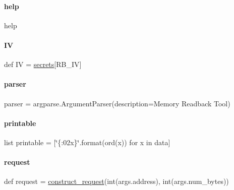 \mbox{\label{namespacereadback_a81ae9faedaa69e3e28e2960a0548df8d}} 
\paragraph{\texorpdfstring{help}{help}}
{\footnotesize\ttfamily help}

\mbox{\label{namespacereadback_ae386c01157ae5fa56c90d5430fda2f06}} 
\paragraph{\texorpdfstring{IV}{IV}}
{\footnotesize\ttfamily def IV = \hyperlink{namespacereadback_a7ef58b6350bb8f1ea4b81d24cac72a55}{secrets}\mbox{[}\textquotesingle{}R\+B\+\_\+\+IV\textquotesingle{}\mbox{]}}

\mbox{\label{namespacereadback_a90eee7a4677ca8b1ed116364a24367f9}} 
\paragraph{\texorpdfstring{parser}{parser}}
{\footnotesize\ttfamily parser = argparse.\+Argument\+Parser(description=\textquotesingle{}Memory Readback Tool\textquotesingle{})}

\mbox{\label{namespacereadback_a27236d5c0ccd38009c3ff7e940446593}} 
\paragraph{\texorpdfstring{printable}{printable}}
{\footnotesize\ttfamily list printable = \mbox{[}\char`\"{}\{\+:02x\}\char`\"{}.\+format(ord(x)) for x in data\mbox{]}}

\mbox{\label{namespacereadback_a7ea72716d3813b3d175a880ff91eca73}} 
\paragraph{\texorpdfstring{request}{request}}
{\footnotesize\ttfamily def request = \hyperlink{namespacereadback_ac98f954f8259c56156baf91af488f6cf}{construct\+\_\+request}(int(args.\+address), int(args.\+num\+\_\+bytes))}

